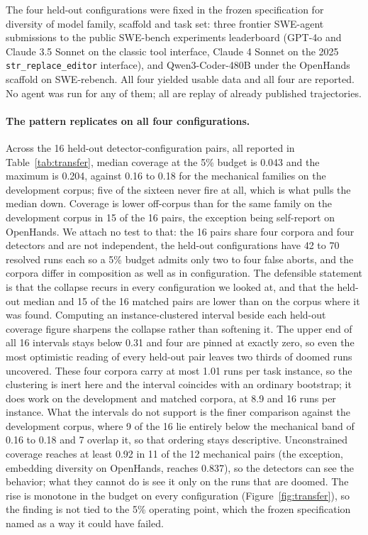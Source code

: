 \documentclass[sigconf,screen]{acmart}
\begin{document}
The four held-out configurations were fixed in the frozen specification for diversity of model
family, scaffold and task set: three frontier SWE-agent submissions to the public SWE-bench
experiments leaderboard (GPT-4o and Claude 3.5 Sonnet on the classic tool interface, Claude 4 Sonnet
on the 2025 \texttt{str\_replace\_\allowbreak editor} interface), and Qwen3-Coder-480B under the
OpenHands scaffold \cite{wang2025openhands} on SWE-rebench. All four yielded usable data and all
four are reported. No agent
was run for any of them; all are replay of already published trajectories.

\paragraph{The pattern replicates on all four configurations.} Across the 16 held-out
detector-configuration pairs, all reported in Table~\ref{tab:transfer}, median coverage at the
5\% budget is 0.043 and the maximum is 0.204,
against 0.16 to 0.18 for the mechanical families on the development corpus; five of the sixteen
never fire at all, which is what pulls the median down. Coverage is lower
off-corpus than for the same family on the development corpus in 15 of the 16 pairs, the exception
being self-report on OpenHands. We attach no test to that: the 16 pairs share four corpora and four
detectors and are not independent, the held-out configurations have 42 to 70 resolved runs each so a
5\% budget admits only two to four false aborts, and the corpora differ in composition as well as in
configuration. The defensible statement is that the collapse recurs in every configuration we looked
at, and that the held-out median and 15 of the 16 matched pairs are lower than on the corpus where it
was found. Computing an instance-clustered interval beside each held-out coverage figure sharpens
the collapse rather than softening it. The upper end of all 16 intervals
stays below 0.31 and four are pinned at exactly zero, so even the most optimistic reading of every
held-out pair leaves two thirds of doomed runs uncovered. These four corpora carry at most 1.01 runs
per task instance, so the clustering is inert here and the interval coincides with an ordinary
bootstrap; it does work on the development and matched corpora, at 8.9 and 16 runs per instance. What the intervals do not support is the
finer comparison against the development corpus, where 9 of the 16 lie entirely below the
mechanical band of 0.16 to 0.18 and 7 overlap it, so that ordering stays descriptive. Unconstrained coverage reaches at least 0.92 in 11 of the 12
mechanical pairs (the exception, embedding diversity on OpenHands, reaches 0.837), so the detectors
can see the behavior; what they cannot do is see it only on the runs that are doomed. The rise is
monotone in the budget on every configuration (Figure~\ref{fig:transfer}), so the finding is not
tied to the 5\% operating point, which the frozen specification named as a way it could have failed.
\end{document}
